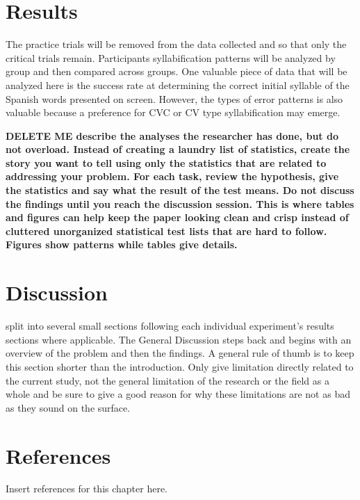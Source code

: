 
\section{Results}

The practice trials will be removed from the data collected and so that only the critical trials remain. Participants syllabification patterns will be analyzed by group and then compared across groups. One valuable piece of data that will be analyzed here is the success rate at determining the correct initial syllable of the Spanish words presented on screen. However, the types of error patterns is also valuable because a preference for CVC or CV type syllabification may emerge. 

\textbf{DELETE ME describe the analyses the researcher has done, but do not overload. Instead of creating a laundry list of statistics, create the story you want to tell using only the statistics that are related to addressing your problem. 
For each task, review the hypothesis, give the statistics and say what the result of the test means. 
Do not discuss the findings until you reach the discussion session. 
This is where tables and figures can help keep the paper looking clean and crisp instead of cluttered unorganized statistical test lists that are hard to follow. 
Figures show patterns while tables give details.}



\section{Discussion}

split into several small sections following each individual experiment’s results sections where applicable. 
The General Discussion steps back and begins with an overview of the problem and then the findings. A general rule of thumb is to keep this section shorter than the introduction. Only give limitation directly related to the current study, not the general limitation of the research or the field as a whole and be sure to give a good reason for why these limitations are not as bad as they sound on the surface.



\section{References}

Insert references for this chapter here.









